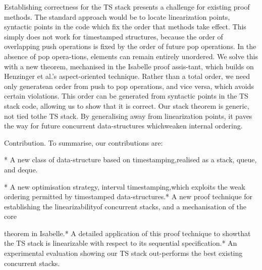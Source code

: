 Establishing correctness for the TS stack presents a challenge for existing
proof methods. 
The standard approach would be to locate linearization points, syntactic points
in the code which fix the order that methods take effect. 
This simply does not work for timestamped structures, because the order of
overlapping push operations is fixed by the order of future pop operations.
In the absence of pop opera-tions, elements can remain entirely unordered. 
We solve this with a new theorem, mechanised in the Isabelle proof assis-tant,
which builds on Henzinger et al.'s aspect-oriented technique. 
Rather than a total order, we need only generatean order from push to pop
operations, and vice versa, which avoids certain violations. 
This order can be generated from syntactic points in the TS stack code, allowing
us to show that it is correct. 
Our stack theorem is generic, not tied tothe TS stack. 
By generalising away from linearization points, it paves the way for future
concurrent data-structures whichweaken internal ordering.

Contribution. To summarise, our contributions are:

* A new class of data-structure based on timestamping,realised as a stack,
queue, and deque.

* A new optimisation strategy, interval timestamping,which exploits the weak
ordering permitted by timestamped data-structures.* A new proof technique for
establishing the linearizabilityof concurrent stacks, and a mechanisation of
the core

theorem in Isabelle.* A detailed application of this proof technique to showthat
the TS stack is linearizable with respect to its sequential specification.*
An experimental evaluation showing our TS stack out-performs the best existing
concurrent stacks.

